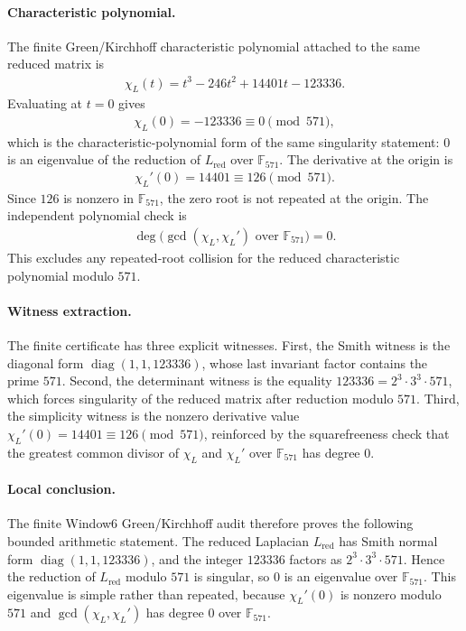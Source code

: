 \paragraph{Characteristic polynomial.}
The finite Green/Kirchhoff characteristic polynomial attached to the same reduced matrix is
$$
\begin{aligned}
\chi_L(t)=t^3-246t^2+14401t-123336.
\end{aligned}
$$
Evaluating at $t=0$ gives
$$
\begin{aligned}
\chi_L(0)=-123336 \equiv 0 \pmod{571},
\end{aligned}
$$
which is the characteristic-polynomial form of the same singularity statement: $0$ is an eigenvalue of the reduction of $L_{\mathrm{red}}$ over $\mathbb{F}_{571}$. The derivative at the origin is
$$
\begin{aligned}
\chi_L'(0)=14401 \equiv 126 \pmod{571}.
\end{aligned}
$$
Since $126$ is nonzero in $\mathbb{F}_{571}$, the zero root is not repeated at the origin. The independent polynomial check is
$$
\begin{aligned}
\deg\bigl(\gcd(\chi_L,\chi_L') \text{ over } \mathbb{F}_{571}\bigr)=0.
\end{aligned}
$$
This excludes any repeated-root collision for the reduced characteristic polynomial modulo $571$.

\paragraph{Witness extraction.}
The finite certificate has three explicit witnesses. First, the Smith witness is the diagonal form $\operatorname{diag}(1,1,123336)$, whose last invariant factor contains the prime $571$. Second, the determinant witness is the equality $123336=2^3\cdot 3^3\cdot 571$, which forces singularity of the reduced matrix after reduction modulo $571$. Third, the simplicity witness is the nonzero derivative value $\chi_L'(0)=14401\equiv126\pmod{571}$, reinforced by the squarefreeness check that the greatest common divisor of $\chi_L$ and $\chi_L'$ over $\mathbb{F}_{571}$ has degree $0$.

\paragraph{Local conclusion.}
The finite Window6 Green/Kirchhoff audit therefore proves the following bounded arithmetic statement. The reduced Laplacian $L_{\mathrm{red}}$ has Smith normal form $\operatorname{diag}(1,1,123336)$, and the integer $123336$ factors as $2^3\cdot 3^3\cdot 571$. Hence the reduction of $L_{\mathrm{red}}$ modulo $571$ is singular, so $0$ is an eigenvalue over $\mathbb{F}_{571}$. This eigenvalue is simple rather than repeated, because $\chi_L'(0)$ is nonzero modulo $571$ and $\gcd(\chi_L,\chi_L')$ has degree $0$ over $\mathbb{F}_{571}$.

